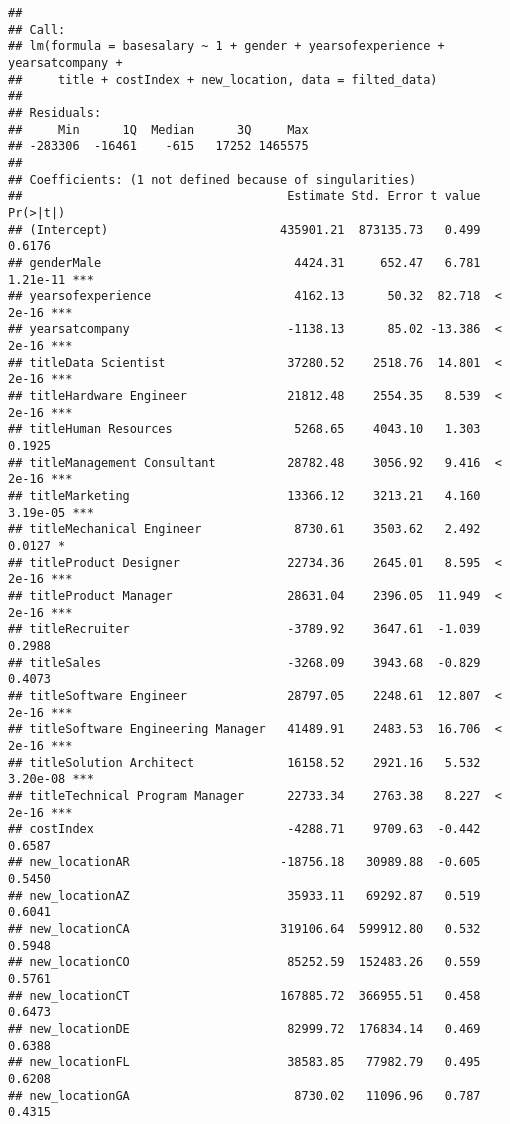 \documentclass[
]{article}
\begin{document}
\begin{verbatim}
## 
## Call:
## lm(formula = basesalary ~ 1 + gender + yearsofexperience + yearsatcompany + 
##     title + costIndex + new_location, data = filted_data)
## 
## Residuals:
##     Min      1Q  Median      3Q     Max 
## -283306  -16461    -615   17252 1465575 
## 
## Coefficients: (1 not defined because of singularities)
##                                     Estimate Std. Error t value Pr(>|t|)    
## (Intercept)                        435901.21  873135.73   0.499   0.6176    
## genderMale                           4424.31     652.47   6.781 1.21e-11 ***
## yearsofexperience                    4162.13      50.32  82.718  < 2e-16 ***
## yearsatcompany                      -1138.13      85.02 -13.386  < 2e-16 ***
## titleData Scientist                 37280.52    2518.76  14.801  < 2e-16 ***
## titleHardware Engineer              21812.48    2554.35   8.539  < 2e-16 ***
## titleHuman Resources                 5268.65    4043.10   1.303   0.1925    
## titleManagement Consultant          28782.48    3056.92   9.416  < 2e-16 ***
## titleMarketing                      13366.12    3213.21   4.160 3.19e-05 ***
## titleMechanical Engineer             8730.61    3503.62   2.492   0.0127 *  
## titleProduct Designer               22734.36    2645.01   8.595  < 2e-16 ***
## titleProduct Manager                28631.04    2396.05  11.949  < 2e-16 ***
## titleRecruiter                      -3789.92    3647.61  -1.039   0.2988    
## titleSales                          -3268.09    3943.68  -0.829   0.4073    
## titleSoftware Engineer              28797.05    2248.61  12.807  < 2e-16 ***
## titleSoftware Engineering Manager   41489.91    2483.53  16.706  < 2e-16 ***
## titleSolution Architect             16158.52    2921.16   5.532 3.20e-08 ***
## titleTechnical Program Manager      22733.34    2763.38   8.227  < 2e-16 ***
## costIndex                           -4288.71    9709.63  -0.442   0.6587    
## new_locationAR                     -18756.18   30989.88  -0.605   0.5450    
## new_locationAZ                      35933.11   69292.87   0.519   0.6041    
## new_locationCA                     319106.64  599912.80   0.532   0.5948    
## new_locationCO                      85252.59  152483.26   0.559   0.5761    
## new_locationCT                     167885.72  366955.51   0.458   0.6473    
## new_locationDE                      82999.72  176834.14   0.469   0.6388    
## new_locationFL                      38583.85   77982.79   0.495   0.6208    
## new_locationGA                       8730.02   11096.96   0.787   0.4315    

\end{verbatim}
\end{document}
